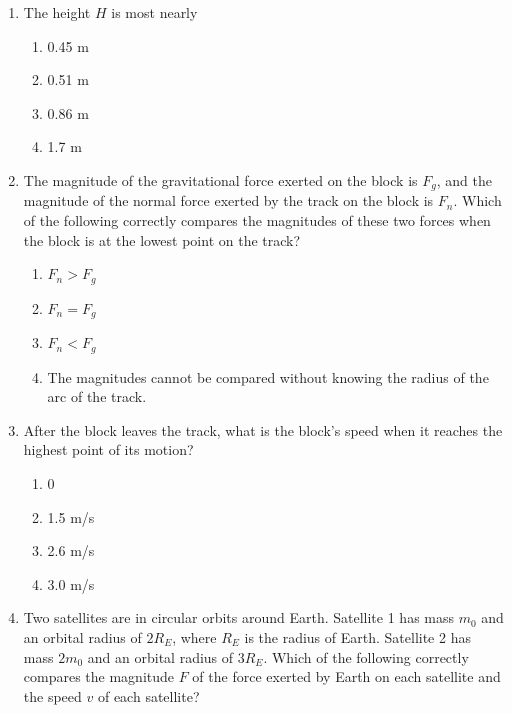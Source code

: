 \documentclass[11pt]{article}
\begin{document}
\begin{multicols}{2}
  \begin{enumerate}[leftmargin=18pt,resume]
  \item The height $H$ is most nearly
    \begin{enumerate}[nosep,leftmargin=18pt,label=(\Alph*)]
    \item 0.45 m
    \item 0.51 m
    \item 0.86 m
    \item 1.7 m
    \end{enumerate}
    \label{first}
    
  \item The magnitude of the gravitational force exerted on the block is $F_g$,
    and the magnitude of the normal force exerted by the track on the block is
    $F_n$. Which of the following correctly compares the magnitudes of these
    two forces when the block is at the lowest point on the track?
    \begin{enumerate}[nosep,leftmargin=18pt,label=(\Alph*)]
    \item $F_n>F_g$
    \item $F_n=F_g$
    \item $F_n<F_g$
    \item The magnitudes cannot be compared without knowing the radius of the
      arc of the track.
    \end{enumerate}
    \vspace{.7in}
    
  \item After the block leaves the track, what is the block's speed when it
    reaches the highest point of its motion?
    \begin{enumerate}[nosep,leftmargin=18pt,label=(\Alph*)]
    \item 0
    \item 1.5 m/s
    \item 2.6 m/s
    \item 3.0 m/s
    \end{enumerate}
    \label{last}
    \vspace{.7in}
    
  \item Two satellites are in circular orbits around Earth. Satellite 1 has
    mass $m_0$ and an orbital radius of $2R_E$, where $R_E$ is the radius of
    Earth. Satellite 2 has mass $2m_0$ and an orbital radius of $3R_E$. Which
    of the following correctly compares the magnitude $F$ of the force exerted
    by Earth on each satellite and the speed $v$ of each satellite?


\end{enumerate}
\end{multicols}
\end{document}
